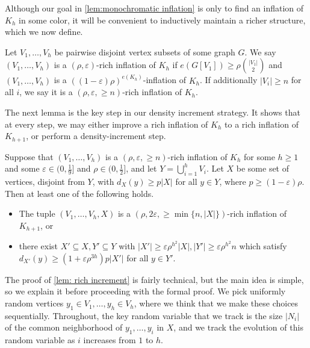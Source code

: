 \documentclass[11pt]{article}
\numberwithin{equation}{section}
\theoremstyle{plain}
\theoremstyle{remark}
\newcommand{\eps}{\ensuremath{\varepsilon}}
\newcommand\ab[1]{\lvert #1 \rvert}
\begin{document}
Although our goal in \cref{lem:monochromatic inflation} is only to find an inflation of $K_h$ in some color, it will be convenient to inductively maintain a richer structure, which we now define.
\begin{definition}
    Let $V_1,\dots,V_h$ be pairwise disjoint vertex subsets of some graph $G$.
    We say $(V_1,\dots,V_h)$ is a $(\rho,\eps)$-rich inflation of $K_h$ if $e(G[V_1])\ge \rho \binom{|V_1|}{2}$ and $(V_1,\dots,V_h)$ is a $((1-\eps)\rho)^{e(K_h)}$-inflation of $K_h$. If additionally $\ab{V_i}\geq n$ for all $i$, we say it is a $(\rho,\eps,\geq n)$-rich inflation of $K_h$.
\end{definition}
The next lemma is the key step in our density increment strategy. It shows that at every step, we may either improve a rich inflation of $K_h$ to a rich inflation of $K_{h+1}$, or perform a density-increment step.




\begin{lemma}\label{lem: rich increment}
    Suppose that $(V_1,\dots,V_h)$ is a $(\rho,\eps,\geq n)$-rich inflation of $K_h$ for some $h \geq 1$ and some $\eps \in (0,\frac 19]$ and $\rho \in (0,\frac 12]$, and let $Y = \bigcup_{i=1}^h V_i$. Let $X$ be some set of vertices, disjoint from $Y$, with  $d_X(y)\ge p|X|$ for all $y\in Y$, where $p \geq (1-\eps)\rho$. Then at least one of the following holds.
    \begin{itemize}
        \item The tuple $(V_1,\dots,V_h,X)$ is a $(\rho,2\eps,\geq \min\{n,\ab X\})$-rich inflation of $K_{h+1}$, or
        \item there exist $X' \subseteq X, Y' \subseteq Y$ with $|X'|\ge \eps \rho^{h^2}|X|,|Y'|\ge \eps \rho^{h^2} n$ which satisfy $d_{X'}(y)\ge (1+\eps \rho^{3h})p|X'|$ for all $y\in Y'$.
    \end{itemize}
\end{lemma}
The proof of \cref{lem: rich increment} is fairly technical, but the main idea is simple, so we explain it before proceeding with the formal proof. We pick uniformly random vertices $y_1 \in V_1,\dots,y_h \in V_h$, where we think that we make these choices sequentially. Throughout, the key random variable that we track is the size $\ab{N_i}$ of the common neighborhood of $y_1,\dots,y_i$ in $X$, and we track the evolution of this random variable as $i$ increases from $1$ to $h$. 
\end{document}
